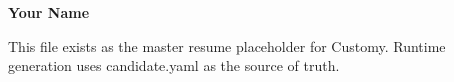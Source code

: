 \documentclass[10pt,a4paper]{article}
\begin{document}
\textbf{Your Name}

This file exists as the master resume placeholder for Customy.
Runtime generation uses candidate.yaml as the source of truth.
\end{document}
